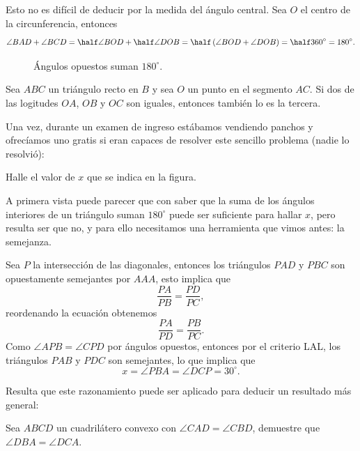 Esto no es difícil de deducir por
la medida del ángulo central. Sea
$O$ el centro de la circunferencia,
entonces
\[\angle BAD + \angle BCD = \half\angle BOD + \half\angle DOB = \half\left(\angle BOD + \angle DOB\right) = \half 360^\circ = 180^\circ.\]
\begin{figure}[H]
	\begin{center}
		
	\end{center}
	\caption{Ángulos opuestos suman $180^\circ$.}
\end{figure}

\begin{lemma}\label{lemma:righttrianglemindpoint}
	Sea $ABC$ un triángulo recto en $B$
	y sea $O$ un punto en el segmento
	$AC$. Si dos de las logitudes
	$OA$, $OB$ y $OC$ son iguales,
	entonces también lo es la tercera.
\end{lemma}

Una vez, durante un examen de ingreso estábamos
vendiendo panchos y ofrecíamos uno gratis si
eran capaces de resolver este sencillo problema
(nadie lo resolvió):

\begin{example}
	Halle el valor de $x$ que se indica en la figura.
	\begin{figure}[H]
		\begin{center}
			
		\end{center}
	\end{figure}
\end{example}

A primera vista puede parecer que
con saber que la suma de los ángulos
interiores de un triángulo
suman $180^\circ$ puede ser suficiente
para hallar $x$, pero
resulta ser que no,
y para ello necesitamos una
herramienta que vimos antes:
la semejanza.

Sea $P$ la intersección de las diagonales,
entonces los triángulos $PAD$
y $PBC$ son opuestamente semejantes
por $AAA$, esto implica que
\[\frac{PA}{PB} = \frac{PD}{PC},\]
reordenando la ecuación obtenemos
\[\frac{PA}{PD} = \frac{PB}{PC}.\]
Como $\angle APB = \angle CPD$
por ángulos opuestos, entonces por
el criterio LAL, los triángulos $PAB$
y $PDC$ son semejantes,
lo que implica que
\[x = \angle PBA = \angle DCP = 30^\circ.\]

Resulta que este razonamiento puede
ser aplicado para deducir un resultado más general:
\begin{problem}
Sea $ABCD$ un cuadrilátero convexo
con $\angle CAD = \angle CBD$,
demuestre que $\angle DBA = \angle DCA$.
\end{problem}

